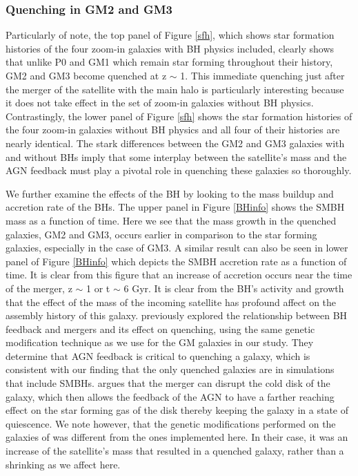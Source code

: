 \documentclass[]{emulateapj}
\begin{document}
\subsubsection{Quenching in GM2 and GM3}
Particularly of note, the top panel of Figure \ref{sfh}, which shows star formation histories of the four zoom-in galaxies with BH physics included, clearly shows that unlike P0 and GM1 which remain star forming throughout their history, GM2 and GM3 become quenched at z $\sim$ 1. This immediate quenching just after the merger of the satellite with the main halo is particularly interesting because it does not take effect in the set of zoom-in galaxies without BH physics. Contrastingly, the lower panel of Figure \ref{sfh} shows the star formation histories of the four zoom-in galaxies without BH physics and all four of their histories are nearly identical. The stark differences between the GM2 and GM3 galaxies with and without BHs imply that some interplay between the satellite's mass and the AGN feedback must play a pivotal role in quenching these galaxies so thoroughly. 

We further examine the effects of the BH by looking to the mass buildup and accretion rate of the BHs. The upper panel in Figure \ref{BHinfo} shows the SMBH mass as a function of time. Here we see that the mass growth in the quenched galaxies, GM2 and GM3, occurs earlier in comparison to the star forming galaxies, especially in the case of GM3. A similar result can also be seen in lower panel of Figure \ref{BHinfo} which depicts the SMBH accretion rate as a function of time. It is clear from this figure that an increase of accretion occurs near the time of the merger, z $\sim$ 1 or t $\sim$ 6 Gyr. It is clear from the BH's activity and growth that the effect of the mass of the incoming satellite has profound affect on the assembly history of this galaxy. \cite{Pontzen2016} previously explored the relationship between BH feedback and mergers and its effect on quenching, using the same genetic modification technique as we use for the GM galaxies in our study. They determine that AGN feedback is critical to quenching a galaxy, which is consistent with our finding that the only quenched galaxies are in simulations that include SMBHs. \cite{Pontzen2016} argues that the merger can disrupt the cold disk of the galaxy, which then allows the feedback of the AGN to have a farther reaching effect on the star forming gas of the disk thereby keeping the galaxy in a state of quiescence. We note however, that the genetic modifications performed on the galaxies of \citep{Pontzen2016} was different from the ones implemented here. In their case, it was an increase of the satellite's mass that resulted in a quenched galaxy, rather than a shrinking as we affect here.
\end{document}
